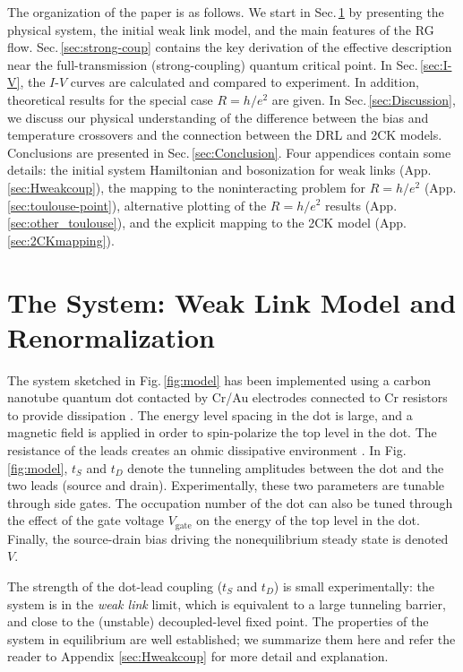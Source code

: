 \documentclass[aps,prb,reprint,floatfix,superscriptaddress,amssymb,amsmath]{revtex4-2}
\newcommand{\Vg}{V_\text{gate}}
\begin{document}
The organization of the paper is as follows. We start in Sec.\,\ref{sec:model-hamiltonian} by presenting the physical system, the initial weak link model, and the main features of the RG flow. 
Sec.\,\ref{sec:strong-coup} contains the key derivation of the effective description near the full-transmission (strong-coupling) quantum critical point. In Sec.\,\ref{sec:I-V}, the $I$-$V$ curves are calculated and compared to experiment. In addition, theoretical results for the special case $R\!=\!h/e^2$ are given. 
In Sec.\,\ref{sec:Discussion}, we discuss our physical understanding of the difference between the bias and temperature crossovers and the connection between the DRL and 2CK models. Conclusions are presented in Sec.\,\ref{sec:Conclusion}. 
Four appendices contain some details: the initial system Hamiltonian and bosonization for weak links (App.\,\ref{sec:Hweakcoup}), the mapping to the noninteracting problem for $R\!=\!h/e^2$ (App.\,\ref{sec:toulouse-point}), alternative plotting of the $R\!=\!h/e^2$ results (App.\,\ref{sec:other_toulouse}), and the explicit mapping to the 2CK model (App.\,\ref{sec:2CKmapping}). 


\section{The System: Weak Link Model and Renormalization}
\label{sec:model-hamiltonian}

The system sketched in Fig.\,\ref{fig:model} has been implemented using a carbon nanotube quantum dot contacted by Cr/Au electrodes connected to Cr resistors to provide dissipation \cite{Mebrahtu12,Mebrahtu13,ZhangNoneqPRR21}. The energy level spacing in the dot is large, and a magnetic field is applied in order to spin-polarize the top level in the dot. The resistance of the leads creates an ohmic dissipative environment \cite{Bomze09}. 
In Fig.\,\ref{fig:model}, $t_{S}$ and $t_{D}$ denote the tunneling amplitudes between the dot and the two leads (source and drain). Experimentally, these two parameters are tunable through side gates. The occupation number of the dot can also be tuned through the effect of the gate voltage $\Vg$ on the energy of the top level in the dot. Finally, the source-drain bias driving the nonequilibrium steady state is denoted $V$. 

The strength of the dot-lead coupling ($t_S$ and $t_D$) is small experimentally: the system is in the \emph{weak link} limit, which is equivalent to a large tunneling barrier, and close to the (unstable) decoupled-level fixed point. The properties of the system in equilibrium are well established; we summarize them here and refer the reader to Appendix \ref{sec:Hweakcoup} for more detail and explanation. 
\end{document}
